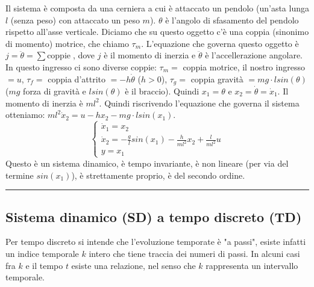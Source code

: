 Il sistema è composta da una cerniera a cui è attaccato un pendolo (un'asta lunga $l$ (senza peso) con attaccato un peso $m$). $\theta$ è l'angolo di sfasamento del pendolo rispetto all'asse verticale. Diciamo che su questo oggetto c'è una coppia (sinonimo di momento) motrice, che chiamo $\tau_m$.\newline
L'equazione che governa questo oggetto è $j = \ddot{\theta} = \sum \text{coppie}\;$, dove $j$ è il momento di inerzia e $\ddot{\theta}$ è l'accellerazione angolare. In questo ingresso ci sono diverse coppie: $\tau_m =$ coppia motrice, il nostro ingresso $= u$, $\tau_f= $ coppia d'attrito $=-h \dot{\theta}$ ($h>0$), $\tau_g =$ coppia gravità $= mg \cdot  l sin(\theta)$ ($mg$ forza di gravità e $l sin(\theta)$ è il braccio).\newline
Quindi $x_1 = \theta$ e $x_2 = \dot{\theta} = \dot{x}_1$.\newline
Il momento di inerzia è $m l^2$.\newline
Quindi riscrivendo l'equazione che governa il sistema otteniamo: $m l^2 \dot{x}_2 = u - h x_2 - m g \cdot l sin(x_1)$.
\[
    \begin{cases}
        \dot{x}_1 = x_2\\
        \dot{x}_2 = - \frac{g}{l} sin(x_1) - \frac{h}{ml^2}x_2 + \frac{l}{ml^2}u\\
        y = x_1
    \end{cases}
\]
Questo è un sistema dinamico, è tempo invariante, è non lineare (per via del termine $sin(x_1)$), è strettamente proprio, è del secondo ordine.\newline
\rule{\textwidth}{0,4pt}
\subsection{Sistema dinamico (SD) a tempo discreto (TD)}
Per tempo discreto si intende che l'evoluzione temporate è "a passi", esiste infatti un indice temporale $k$ intero che tiene traccia dei numeri di passi. In alcuni casi fra $k$ e il tempo $t$ esiste una relazione, nel senso che $k$ rappresenta un intervallo temporale.\newline
